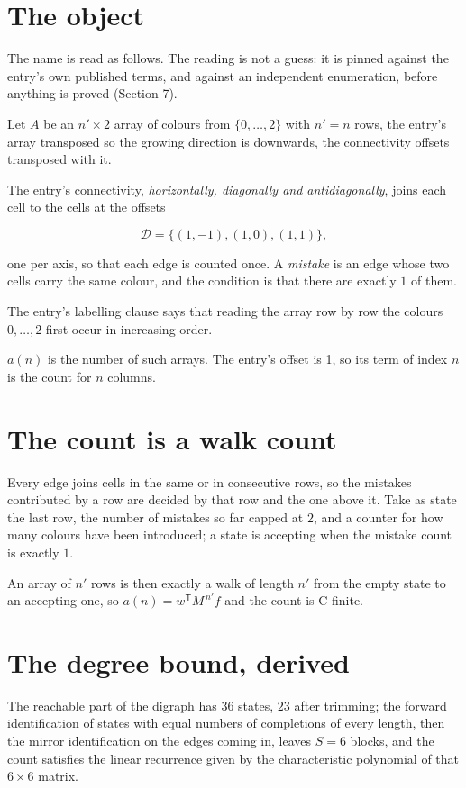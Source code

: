 \documentclass[11pt]{article}
\theoremstyle{definition}
\begin{document}
\section{The object}

The name is read as follows. The reading is not a guess: it is pinned against the entry's own published terms, and against an independent enumeration, before anything is proved (Section 7).

Let $A$ be an $n' \times 2$ array of colours from $\{0,\dots,2\}$ with $n' = n$ rows, the entry's array transposed so the growing direction is downwards, the connectivity offsets transposed with it.

The entry's connectivity, {\itshape horizontally, diagonally and antidiagonally}, joins each cell to the cells at the offsets

\[\mathcal{D} = \{(1,-1), (1,0), (1,1)\},\]

one per axis, so that each edge is counted once. A {\itshape mistake} is an edge whose two cells carry the same colour, and the condition is that there are exactly $1$ of them.

The entry's labelling clause says that reading the array row by row the colours $0,\dots,2$ first occur in increasing order.

$a(n)$ is the number of such arrays. The entry's offset is 1, so its term of index $n$ is the count for $n$ columns.

\section{The count is a walk count}

Every edge joins cells in the same or in consecutive rows, so the mistakes contributed by a row are decided by that row and the one above it. Take as state the last row, the number of mistakes so far capped at $2$, and a counter for how many colours have been introduced; a state is accepting when the mistake count is exactly $1$.

An array of $n'$ rows is then exactly a walk of length $n'$ from the empty state to an accepting one, so $a(n) = w^{\mathsf T}M^{\,n'}f$ and the count is C-finite.

\section{The degree bound, derived}

The reachable part of the digraph has $36$ states, $23$ after trimming; the forward identification of states with equal numbers of completions of every length, then the mirror identification on the edges coming in, leaves $S = 6$ blocks, and the count satisfies the linear recurrence given by the characteristic polynomial of that $6\times6$ matrix.
\end{document}
